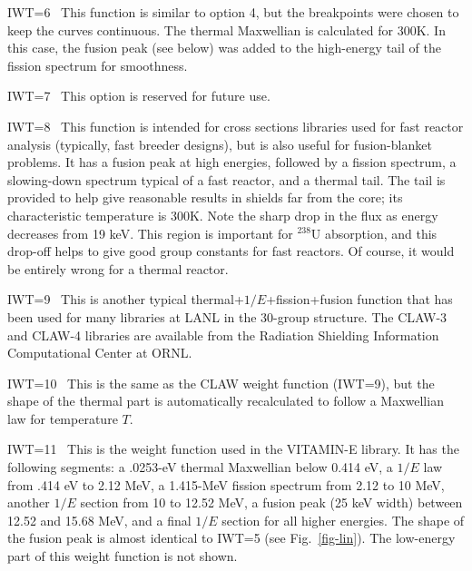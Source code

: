 \begin{description}
\begin{singlespace}
\item{IWT=6\ } This function is similar to option 4, but the breakpoints
   were chosen to keep the curves continuous.  The thermal Maxwellian
   is calculated for 300K.  In this case, the fusion peak (see below)
   was added to the high-energy tail of the fission spectrum for
   smoothness.

\item{IWT=7\ }  This option is reserved for future use.

\item{IWT=8\ } This function is intended for cross sections libraries
   used for fast reactor analysis (typically, fast breeder
   designs), but is also useful for fusion-blanket problems.  It has
   a fusion peak at high energies, followed by a fission spectrum, a
   slowing-down spectrum typical of a fast reactor, and a thermal tail.
   The tail is provided to help give reasonable results in shields
   far from the core; its characteristic temperature is 300K.  Note
   the sharp drop in the flux as energy decreases from 19 keV.  This
   region is important for $^{238}$U absorption, and this drop-off helps
   to give good group constants for fast reactors.  Of course, it
   would be entirely wrong for a thermal reactor.

\item{IWT=9\ } This is another typical thermal+$1/E$+fission+fusion
   function that has been used for many libraries at LANL
   in the 30-group structure.  The CLAW-3 and
   CLAW-4 libraries are available from the Radiation Shielding
   Information Computational Center at ORNL.

\item{IWT=10\ } This is the same as the CLAW weight function
   (IWT=9), but the shape of the thermal part is automatically
   recalculated to follow a Maxwellian law for temperature $T$.

\item{IWT=11\ } This is the weight function used in the
   VITAMIN-E library.  It has the following segments:
   a .0253-eV thermal Maxwellian below 0.414 eV, a $1/E$ law from
   .414 eV to 2.12 MeV, a 1.415-MeV fission spectrum from 2.12 to
   10 MeV, another $1/E$ section from 10 to 12.52 MeV, a fusion
   peak (25 keV width) between 12.52 and 15.68 MeV, and a final
   $1/E$ section for all higher energies.  The shape of the fusion
   peak is almost identical to IWT=5 (see Fig.~\ref{fig-lin}).  The
   low-energy part of this weight function is not shown.
\end{singlespace}
\end{description}

